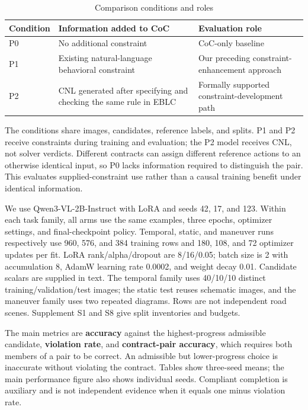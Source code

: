 \documentclass[nolineno]{ieeeaccess}
\begin{document}
\begin{table}[tp]\caption{Comparison conditions and roles}
\centering\fontsize{8}{10}\selectfont\setlength{\tabcolsep}{3pt}
\begin{tabular}{@{}>{\raggedright\arraybackslash}p{}>{\raggedright\arraybackslash}p{}>{\raggedright\arraybackslash}p{}@{}}
\toprule
\textbf{Condition} & \textbf{Information added to CoC} & \textbf{Evaluation role}\\
\midrule
P0 & No additional constraint & CoC-only baseline\\[3pt]
P1 & Existing natural-language behavioral constraint & Our preceding constraint-enhancement approach\\[3pt]
P2 & CNL generated after specifying and checking the same rule in EBLC & Formally supported constraint-development path\\[3pt]
\bottomrule\end{tabular}
\end{table}

The conditions share images, candidates, reference labels, and splits. P1 and P2 receive constraints during training and evaluation; the P2 model receives CNL, not solver verdicts. Different contracts can assign different reference actions to an otherwise identical input, so P0 lacks information required to distinguish the pair. This evaluates supplied-constraint use rather than a causal training benefit under identical information.\par

We use Qwen3-VL-2B-Instruct with LoRA and seeds 42, 17, and 123. Within each task family, all arms use the same examples, three epochs, optimizer settings, and final-checkpoint policy. Temporal, static, and maneuver runs respectively use 960, 576, and 384 training rows and 180, 108, and 72 optimizer updates per fit. LoRA rank/alpha/dropout are 8/16/0.05; batch size is 2 with accumulation 8, AdamW learning rate 0.0002, and weight decay 0.01. Candidate scalars are supplied in text. The temporal family uses 40/10/10 distinct training/validation/test images; the static test reuses schematic images, and the maneuver family uses two repeated diagrams. Rows are not independent road scenes. Supplement S1 and S8 give split inventories and budgets.\par

The main metrics are \textbf{accuracy} against the highest-progress admissible candidate, \textbf{violation rate}, and \textbf{contract-pair accuracy}, which requires both members of a pair to be correct. An admissible but lower-progress choice is inaccurate without violating the contract. Tables show three-seed means; the main performance figure also shows individual seeds. Compliant completion is auxiliary and is not independent evidence when it equals one minus violation rate.\par
\end{document}
